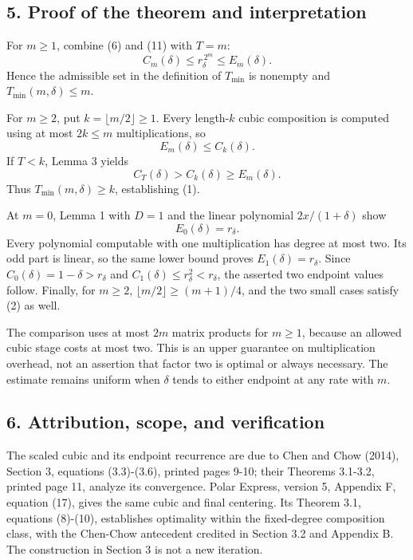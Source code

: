 \documentclass[10pt,a4paper]{article}
\begin{document}

\subsection{5. Proof of the theorem and
interpretation}\label{proof-of-the-theorem-and-interpretation}

For \(m\ge1\), combine (6) and (11) with \(T=m\): \[
C_m(\delta)\le r_\delta^{\,2^m}\le E_m(\delta).
\tag{14}
\] Hence the admissible set in the definition of \(T_{\min}\) is
nonempty and \(T_{\min}(m,\delta)\le m\).

For \(m\ge2\), put \(k=\lfloor m/2\rfloor\ge1\). Every length-\(k\)
cubic composition is computed using at most \(2k\le m\) multiplications,
so \[
E_m(\delta)\le C_k(\delta).
\] If \(T<k\), Lemma 3 yields \[
C_T(\delta)>C_k(\delta)\ge E_m(\delta).
\] Thus \(T_{\min}(m,\delta)\ge k\), establishing (1).

At \(m=0\), Lemma 1 with \(D=1\) and the linear polynomial
\(2x/(1+\delta)\) show \[
E_0(\delta)=r_\delta.
\] Every polynomial computable with one multiplication has degree at
most two. Its odd part is linear, so the same lower bound proves
\(E_1(\delta)=r_\delta\). Since \(C_0(\delta)=1-\delta>r_\delta\) and
\(C_1(\delta)\le r_\delta^2<r_\delta\), the asserted two endpoint values
follow. Finally, for \(m\ge2\), \(\lfloor m/2\rfloor\ge(m+1)/4\), and
the two small cases satisfy (2) as well.

The comparison uses at most \(2m\) matrix products for \(m\ge1\),
because an allowed cubic stage costs at most two. This is an upper
guarantee on multiplication overhead, not an assertion that factor two
is optimal or always necessary. The estimate remains uniform when
\(\delta\) tends to either endpoint at any rate with \(m\).


\subsection{6. Attribution, scope, and
verification}\label{attribution-scope-and-verification}

The scaled cubic and its endpoint recurrence are due to Chen and Chow
(2014), Section 3, equations (3.3)-(3.6), printed pages 9-10; their
Theorems 3.1-3.2, printed page 11, analyze its convergence. Polar
Express, version 5, Appendix F, equation (17), gives the same cubic and
final centering. Its Theorem 3.1, equations (8)-(10), establishes
optimality within the fixed-degree composition class, with the Chen-Chow
antecedent credited in Section 3.2 and Appendix B. The construction in
Section 3 is not a new iteration.
\end{document}
